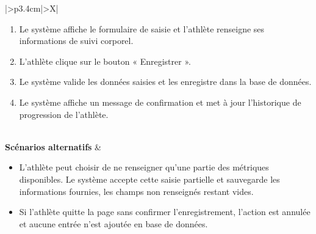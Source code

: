\documentclass[a4paper,12pt]{report}
\begin{document}
\begin{table}[H]
\begin{tabularx}{\textwidth}{|>{\RaggedRight\arraybackslash}p{3.4cm}|>{\RaggedRight\arraybackslash}X|}
\begin{minipage}[t]{\linewidth}
\begin{enumerate}[label=\arabic*., leftmargin=*, topsep=0pt, itemsep=1pt]
    \item Le système affiche le formulaire de saisie et l’athlète renseigne ses informations de suivi corporel.
    \item L’athlète clique sur le bouton « Enregistrer ».
    \item Le système valide les données saisies et les enregistre dans la base de données.
    \item Le système affiche un message de confirmation et met à jour l’historique de progression de l’athlète.
\end{enumerate}
\vspace{2pt}
\end{minipage} \\
\hline
\textbf{Scénarios alternatifs} &
\begin{minipage}[t]{\linewidth}
\vspace{2pt}
\begin{itemize}[leftmargin=*, topsep=0pt, itemsep=1pt]
    \item  L'athlète peut choisir de ne renseigner qu'une partie des métriques disponibles. Le système accepte cette saisie partielle et sauvegarde les informations fournies, les champs non renseignés restant vides.
    \item Si l'athlète quitte la page sans confirmer l'enregistrement, l'action est annulée et aucune entrée n'est ajoutée en base de données.
\end{itemize}
\vspace{2pt}
\end{minipage} \\
\hline
\end{tabularx}
\fussy
\end{table}
\end{document}
